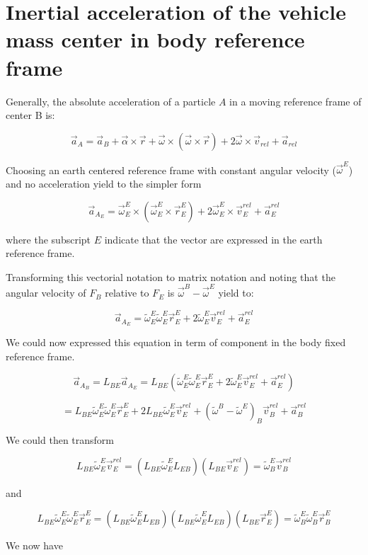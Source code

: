 \documentclass[10pt]{article}
\begin{document}
\section{Inertial acceleration of the vehicle mass center in body
reference frame}

Generally, the absolute acceleration of a particle $A$ in a moving
reference frame of center B is:

$$\vec{a}_A = \vec{a}_B + \vec{\alpha}\times\vec{r} +
\vec{\omega}\times(\vec{\omega}\times\vec{r})
+2\vec{\omega}\times\vec{v}_{rel} + \vec{a}_{rel}$$ 

Choosing an earth centered reference frame with constant angular
velocity ($\vec{\omega}^E$) and no acceleration yield to the simpler form

$$\vec{a}_{A_E} = \vec{\omega}^E_E\times(\vec{\omega}^E_E\times\vec{r}^E_E)
+2\vec{\omega}^E_E\times\vec{v}^{rel}_E + \vec{a}^{rel}_E$$ 

where the subscript $E$ indicate that the vector are expressed in the
earth reference frame.

Transforming this vectorial notation to matrix notation and noting
that the angular velocity of $F_B$ relative to $F_E$ is
$\vec{\omega}^B - \vec{\omega}^E$ yield to:

$$\vec{a}_{A_E} = \tilde{\omega}^E_E\tilde{\omega}^E_E\vec{r}^E_E
+2\tilde{\omega}^E_E\vec{v}^{rel}_E + \vec{a}^{rel}_E$$ 

We could now expressed this equation in term of component in the body
fixed reference frame.

$$\vec{a}_{A_B} = L_{BE}\vec{a}_{A_E} =
L_{BE}(\tilde{\omega}^E_E\tilde{\omega}^E_E\vec{r}^E_E
+2\tilde{\omega}^E_E\vec{v}^{rel}_E + \vec{a}^{rel}_E)$$ 

$$ = L_{BE}\tilde{\omega}^E_E\tilde{\omega}^E_E\vec{r}^E_E +
2L_{BE}\tilde{\omega}^E_E\vec{v}^{rel}_E + (\tilde{\omega}^B -
\tilde{\omega}^E)_B\vec{v}^{rel}_B + \vec{a}^{rel}_B$$


We could then transform

$$L_{BE}\tilde{\omega}^E_E\vec{v}^{rel}_E = (L_{BE}\tilde{\omega}^E_E
L_{EB})(L_{BE}\vec{v}^{rel}_E) = \tilde{\omega}^E_B\vec{v}^{rel}_B$$

and

$$L_{BE}\tilde{\omega}^E_E\tilde{\omega}^E_E\vec{r}^E_E =
(L_{BE}\tilde{\omega}^E_E L_{EB})(L_{BE}\tilde{\omega}^E_E
L_{EB})(L_{BE}\vec{r}^E_E) =
\tilde{\omega}^E_B\tilde{\omega}^E_B\vec{r}^E_B$$ 

We now have
\end{document}
